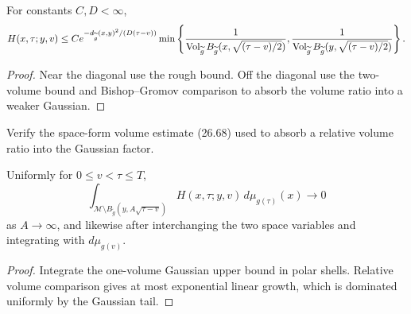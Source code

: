 \begin{corollary}
\label{cor:chow-iii-evolving-heat-kernel-one-volume-upper-bound}


For constants \(C,D<\infty\),
\[
 H(x,\tau;y,v)\le Ce^{-d_{\widetilde g}(x,y)^2/(D(\tau-v))}
 \min\left\{
 \frac1{\operatorname{Vol}_{\widetilde g}B_{\widetilde g}(x,\sqrt{(\tau-v)/2})},
 \frac1{\operatorname{Vol}_{\widetilde g}B_{\widetilde g}(y,\sqrt{(\tau-v)/2})}
 \right\}.
\]
\end{corollary}
\begin{proof}
\sketch Near the diagonal use the rough bound.  Off the diagonal use the two-volume
bound and Bishop--Gromov comparison to absorb the volume ratio into a weaker
Gaussian.
\end{proof}

\begin{claim}
\label{clm:chow-iii-space-form-volume-absorption-exercise}


Verify the space-form volume estimate (26.68) used to absorb a relative
volume ratio into the Gaussian factor.
\end{claim}

\begin{lemma}
\label{lem:chow-iii-heat-kernel-mass-concentration}


Uniformly for \(0\le v<\tau\le T\),
\[
 \int_{\mathcal M\setminus B_{\widetilde g}(y,A\sqrt{\tau-v})}
 H(x,\tau;y,v)\,d\mu_{g(\tau)}(x)\longrightarrow0
\]
as \(A\to\infty\), and likewise after interchanging the two space variables
and integrating with \(d\mu_{g(v)}\).
\end{lemma}
\begin{proof}
\sketch Integrate the one-volume Gaussian upper bound in polar shells.  Relative
volume comparison gives at most exponential linear growth, which is dominated
uniformly by the Gaussian tail.
\end{proof}

